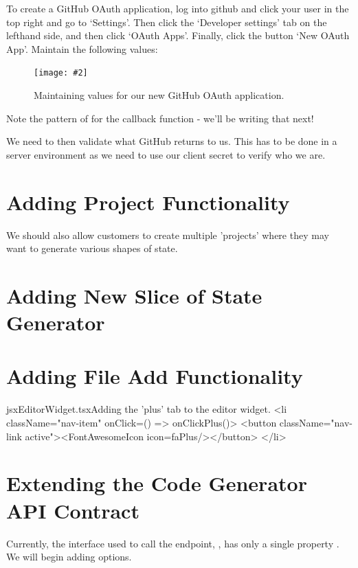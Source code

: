\documentclass[a4paper,headinclude=on,footinclude=on,12pt,oneside]{scrbook}
\newcommand{\standardfigure}[3]{\begin{figure}[H]\begin{center}\texttt{[image: \#2]}\caption{#3}\label{fig:#2}\end{center}\end{figure}}
\begin{document}

To create a GitHub OAuth application, log into github and click your user in the top right and go to `Settings'. Then click the `Developer settings' tab on the lefthand side, and then click `OAuth Apps'. Finally, click the button `New OAuth App'. Maintain the following values:

\standardfigure{\textwidth}{frontend/oauth/github}{Maintaining values for our new GitHub OAuth application.}

Note the pattern of  for the callback function - we'll be writing that next!


We need to then validate what GitHub returns to us. This has to be done in a server environment as we need to use our client secret to verify who we are.

\section{Adding Project Functionality}

We should also allow customers to create multiple 'projects' where they may want to generate various shapes of state.

\section{Adding New Slice of State Generator}

\section{Adding File Add Functionality}

\begin{codeInput}{jsx}{EditorWidget.tsx}{Adding the 'plus' tab to the editor widget.}
<li className="nav-item" onClick={() => onClickPlus()}>
  <button className="nav-link active"><FontAwesomeIcon icon={faPlus}/></button>
</li>
\end{codeInput}

\section{Extending the Code Generator API Contract}

Currently, the interface used to call the  endpoint, , has only a single property . We will begin adding options.
\end{document}
